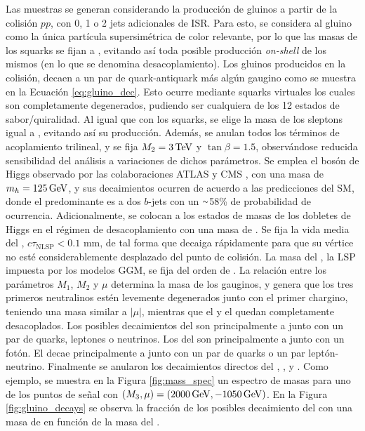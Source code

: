 Las muestras se generan considerando la producción de gluinos a partir de la colisión $pp$, con 0, 1 o 2 jets adicionales de ISR. Para esto, se considera al gluino como la única partícula supersimétrica de color relevante, por lo que las masas de los squarks se fijan a , evitando así toda posible producción \textit{on-shell} de los mismos (en lo que se denomina desacoplamiento). Los gluinos producidos en la colisión, decaen a un par de quark-antiquark más algún gaugino como se muestra en la Ecuación \ref{eq:gluino_dec}. Esto ocurre mediante squarks virtuales los cuales son completamente degenerados, pudiendo ser cualquiera de los 12 estados de sabor/quiralidad.
Al igual que con los squarks, se elige la masa de los sleptons igual a , evitando así su producción.
Además, se anulan todos los términos de acoplamiento trilineal, y se fija $M_2=3\,\text{TeV}$ y $\tan{\beta}=1.5$, observándose reducida sensibilidad del análisis a variaciones de dichos parámetros. Se emplea el bosón de Higgs observado por las colaboraciones ATLAS y CMS \cite{higgs_mass}, con una masa de $m_h=125\,\text{GeV}$, y sus decaimientos ocurren de acuerdo a las predicciones del SM, 
donde el predominante es a dos $b$-jets con un {$\smallsim$}58\% de probabilidad de ocurrencia.
Adicionalmente, se colocan a los estados de masas de los dobletes de Higgs en el régimen de desacoplamiento con una masa de .
Se fija la vida media del \ninoone, $c\tau_{\text{NLSP}}<0.1$ mm, de tal forma que decaiga rápidamente para que su vértice no esté considerablemente desplazado del punto de colisión. 
La masa del \gravino, la LSP impuesta por los modelos GGM, se fija del orden de .
La relación entre los parámetros $M_1$, $M_2$ y $\mu$ determina la masa de los gauginos, y genera que los tres primeros neutralinos estén levemente degenerados junto con el primer chargino, teniendo una masa similar a $|\mu|$, mientras que el \ninofour y el \chinotwopm quedan completamente desacoplados. Los posibles decaimientos del \ninotwo son principalmente a \ninoone junto con un par de quarks, leptones o neutrinos. Los del \ninothree son principalmente a \ninoone junto con un fotón. El \chinoonepm decae principalmente a \ninoone junto con un par de quarks o un par leptón-neutrino. Finalmente se anularon los decaimientos directos del \gluino, \ninotwo, \ninothree y \chinoonepm. Como ejemplo, se muestra en la Figura \ref{fig:mass_spec} un espectro de masas para uno de los puntos de señal con $(M_3, \mu) = (2000\,\text{GeV}, -1050\,\text{GeV})$. En la Figura \ref{fig:gluino_decays} se observa la fracción de los posibles decaimiento del \gluino con una masa de  en función de la masa del \ninoone. 


